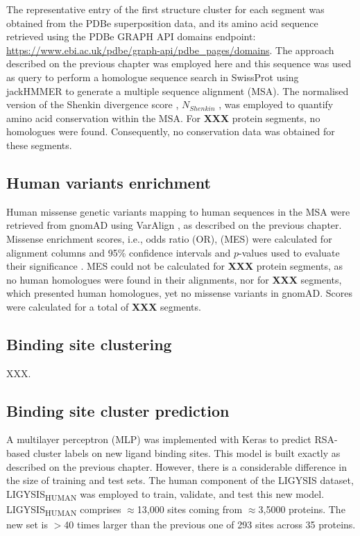 The representative entry of the first structure cluster for each segment was obtained from the PDBe superposition data, and its amino acid sequence retrieved using the PDBe GRAPH API domains endpoint: \url{https://www.ebi.ac.uk/pdbe/graph-api/pdbe_pages/domains}. The approach described on the previous chapter was employed here and this sequence was used as query to perform a homologue sequence search in SwissProt \cite{BOUTET_2016_UNIPROT} using jackHMMER \cite{EDDY_1995_HMMER} to generate a multiple sequence alignment (MSA). The normalised version of the Shenkin divergence score \cite{SHENKIN_1991_SCORE}, $N_{Shenkin}$ \cite{UTGES_2021_ANKS}, was employed to quantify amino acid conservation within the MSA. For \textbf{XXX} protein segments, no homologues were found. Consequently, no conservation data was obtained for these segments. 

\subsection{Human variants enrichment}

Human missense genetic variants mapping to human sequences in the MSA were retrieved from gnomAD \cite{KARCZEWSKI_2020_GNOMAD} using VarAlign \cite{MACGOWAN_2017_VARIANTS, MACGOWAN_2024_VARIANTS}, as described on the previous chapter. Missense enrichment scores, i.e., odds ratio (OR), (MES) were calculated for alignment columns and 95\% confidence intervals and $p$-values used to evaluate their significance \cite{SZUMILAS_2010_ODDSRATIOS}. MES could not be calculated for \textbf{XXX} protein segments, as no human homologues were found in their alignments, nor for \textbf{XXX} segments, which presented human homologues, yet no missense variants in gnomAD. Scores were calculated for a total of \textbf{XXX} segments.

\subsection{Binding site clustering}

XXX.

\subsection{Binding site cluster prediction}

A multilayer perceptron (MLP) was implemented with Keras \cite{CHOLLET_2015_KERAS} to predict RSA-based cluster labels on new ligand binding sites. This model is built exactly as described on the previous chapter. However, there is a considerable difference in the size of training and test sets. The human component of the LIGYSIS dataset, LIGYSIS\textsubscript{HUMAN} was employed to train, validate, and test this new model. LIGYSIS\textsubscript{HUMAN} comprises $\approx$13,000 sites coming from $\approx$3,5000 proteins. The new set is $>$40 times larger than the previous one of 293 sites across 35 proteins.

